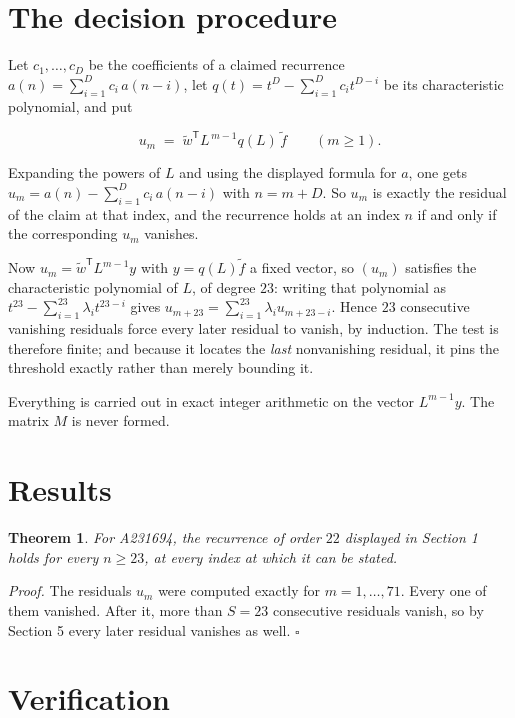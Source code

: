 \documentclass[11pt]{article}
\newtheorem{theorem}{Theorem}
\theoremstyle{definition}
\begin{document}
\section{The decision procedure}

Let $c_1,\dots,c_D$ be the coefficients of a claimed recurrence $a(n) = \sum_{i=1}^{D} c_i\,a(n-i)$, let $q(t) = t^{D} - \sum_{i=1}^{D} c_i t^{D-i}$ be its characteristic polynomial, and put

\[u_m \;=\; \tilde w^{\mathsf T} L^{\,m-1} q(L)\,\tilde f \qquad (m \ge 1).\]

Expanding the powers of $L$ and using the displayed formula for $a$, one gets $u_m = a(n) - \sum_{i=1}^{D} c_i\,a(n-i)$ with $n = m + D$. So $u_m$ is exactly the residual of the claim at that index, and the recurrence holds at an index $n$ if and only if the corresponding $u_m$ vanishes.

Now $u_m = \tilde w^{\mathsf T} L^{m-1} y$ with $y = q(L)\tilde f$ a fixed vector, so $(u_m)$ satisfies the characteristic polynomial of $L$, of degree $23$: writing that polynomial as $t^{23} - \sum_{i=1}^{23} \lambda_i t^{23-i}$ gives $u_{m+23} = \sum_{i=1}^{23} \lambda_i u_{m+23-i}$. Hence $23$ consecutive vanishing residuals force every later residual to vanish, by induction. The test is therefore finite; and because it locates the {\itshape last} nonvanishing residual, it pins the threshold exactly rather than merely bounding it.

Everything is carried out in exact integer arithmetic on the vector $L^{m-1}y$. The matrix $M$ is never formed.

\section{Results}

\begin{theorem} For A231694, the recurrence of order $22$ displayed in Section 1 holds for every $n \ge 23$, at every index at which it can be stated.\end{theorem}

{\itshape Proof.} The residuals $u_m$ were computed exactly for $m = 1,\dots,71$. Every one of them vanished. After it, more than $S = 23$ consecutive residuals vanish, so by Section 5 every later residual vanishes as well. $\square$

\section{Verification}
\end{document}
